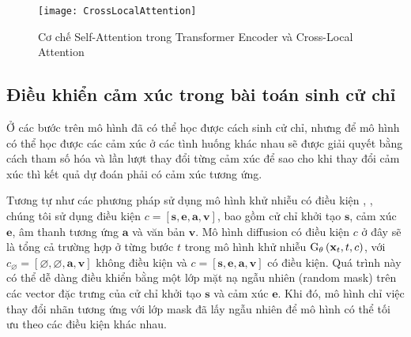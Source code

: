 \begin{figure}[H]
	\centering
	\texttt{[image: CrossLocalAttention]}
	\caption{Cơ chế Self-Attention trong Transformer Encoder và Cross-Local Attention}
	\label{fig:CrossLocalAttention}
\end{figure}











\subsection{Điều khiển cảm xúc trong bài toán sinh cử chỉ}

Ở các bước trên mô hình đã có thể học được cách sinh cử chỉ, nhưng để mô hình có thể học được các cảm xúc ở các tình huống khác nhau sẽ được giải quyết bằng cách tham số hóa và lần lượt thay đổi từng cảm xúc để sao cho khi thay đổi cảm xúc thì kết quả dự đoán phải có cảm xúc tương ứng.

Tương tự như các phương pháp sử dụng mô hình khử nhiễu có điều kiện \cite{ho2022classifier}, \cite{tevet2022human}, chúng tôi sử dụng điều kiện $c = [ \mathbf{s}, \mathbf{e}, \mathbf{a}, \mathbf{v} ]$,  bao gồm cử chỉ khởi tạo $\mathbf{s}$, cảm xúc $\mathbf{e}$, âm thanh tương ứng $\mathbf{a}$ và văn bản $\mathbf{v}$. Mô hình diffusion có điều kiện $c$ ở đây sẽ là tổng cả trường hợp ở từng bước $t$ trong mô hình khử nhiễu $\text{G}_\theta \left( \mathbf{x}_{t}, t, c \right)$, với  $c_{\varnothing}=[\varnothing, \varnothing, \mathbf{a}, \mathbf{v}]$ không điều kiện và $c = [\mathbf{s}, \mathbf{e}, \mathbf{a}, \mathbf{v}]$ có điều kiện. Quá trình này có thể dễ dàng điều khiển bằng một lớp mặt nạ ngẫu nhiên (random mask) trên các vector đặc trưng của cử chỉ khởi tạo $\mathbf{s}$ và cảm xúc $\mathbf{e}$. Khi đó, mô hình chỉ việc thay đổi nhãn tương ứng với lớp mask đã lấy ngẫu nhiên để mô hình có thể tối ưu theo các điều kiện khác nhau. 

